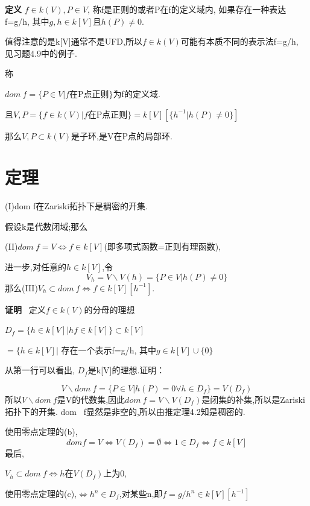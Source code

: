 \documentclass[UTF8]{book}
\begin{document}
		\textbf{定义} $f\in k(V),P\in V$, 称f是正则的或者P在f的定义域内, 如果存在一种表达f=g/h, 其中$g,h\in k[V]$且$h(P)\neq 0$.

		值得注意的是k[V]通常不是UFD,所以$f\in k(V)$可能有本质不同的表示法f=g/h, 见习题4.9中的例子.

		称

		\center  $dom \ f=\{P\in V\vert f$在P点正则$\}$为f的定义域.

						且$V,P=\{f\in k(V) \vert f$在P点正则$\}=k[V][\{h^{-1}\vert h(P)\neq 0\}]$

		\justifying
		那么$V,P\subset k(V)$是子环,是V在P点的局部环.
	\section{定理}
		(I)dom f在Zariski拓扑下是稠密的开集.

		假设k是代数闭域;那么

		(II)$dom \ f=V\iff f\in k[V]$(即多项式函数=正则有理函数),

		进一步,对任意的$h\in k[V]$,令
		\begin{equation*}
		V_{h}=V\backslash V(h)=\{P\in V \vert h(P)\neq 0\}
		\end{equation*}
		那么(III)$V_{h}\subset dom \ f \iff f\in k[V][h^{-1}]$.

		\textbf{证明} \ 定义$f\in k(V)$的分母的理想

		\center $ D_{f}=\{ h\in k[V] \vert hf\in k[V] \}\subset k[V]$




			  $ =\{ h\in k[V] \vert$ 存在一个表示f=g/h, 其中$g\in k[V]\cup \{0\}$

		\justifying

		从第一行可以看出, $D_{f}$是k[V]的理想.证明：

		\begin{equation*}
		V\backslash dom \ f=\{P\in V \vert h(P)= 0 \forall h\in D_{f}\}=V(D_{f})
		\end{equation*}
		所以$V\backslash dom \ f$是V的代数集,因此$dom \ f=V\backslash V(D_{f})$是闭集的补集,所以是Zariski拓扑下的开集. dom \ f显然是非空的,所以由推定理4.2知是稠密的.

		使用零点定理的(b),
		\begin{equation*}
		dom f=V\iff V(D_{f})=\emptyset \iff 1\in D_{f} \iff f\in k[V]
		\end{equation*}
		最后,

		$V_{h}\subset dom \ f \iff h $在$V(D_{f})$上为0,

		使用零点定理的(c),$\iff h^{n}\in D_{f}$,对某些n,即$f=g/h^{n}\in k[V][h^{-1}]$
\end{document}

